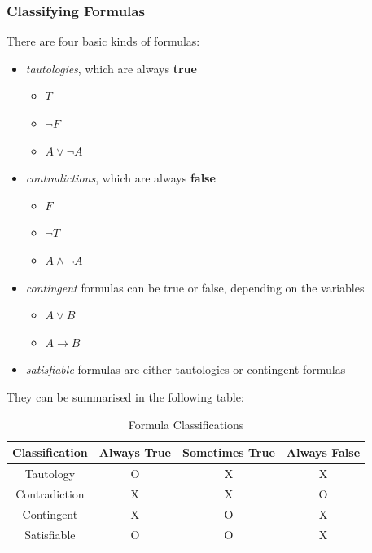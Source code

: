 \documentclass{article}
\begin{document}
\subsubsection{Classifying Formulas}
There are four basic kinds of formulas:
\begin{itemize}
    \item \emph{tautologies}, which are always \textbf{true}
    \begin{itemize}
        \item \(T\)
        \item \(\neg F\)
        \item \(A \vee \neg A\)
    \end{itemize}
    \item \emph{contradictions}, which are always \textbf{false}
    \begin{itemize}
        \item \(F\)
        \item \(\neg T\)
        \item \(A \wedge \neg A\)
    \end{itemize}
    \item \emph{contingent} formulas can be true or false, depending on the variables
    \begin{itemize}
        \item \(A \vee B\)
        \item \(A \rightarrow B\)
    \end{itemize}
    \item \emph{satisfiable} formulas are either tautologies or contingent formulas
\end{itemize}
They can be summarised in the following table:
\begin{table}[h]
    \centering
    \caption{Formula Classifications}
    \begin{tabular}{c|c|c|c}
        Classification & Always True & Sometimes True & Always False   \\ \hline
        Tautology      & O           & X              & X              \\
        Contradiction  & X           & X              & O              \\
        Contingent     & X           & O              & X              \\
        Satisfiable    & O           & O              & X              \\
    \end{tabular}
\end{table}
\end{document}
